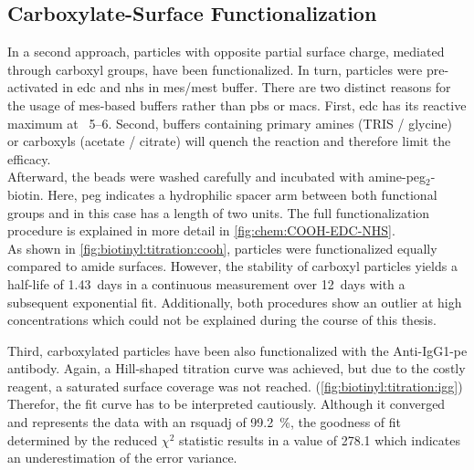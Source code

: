 \subsection{Carboxylate-Surface Functionalization}
In a second approach, particles with opposite partial surface charge, mediated through \gls{carboxyl} groups, have been functionalized. In turn, particles were pre-activated in \gls{edc} and \gls{nhs} in \gls{mes}/\gls{mest} buffer. There are two distinct reasons for the usage of \gls{mes}-based buffers rather than \gls{pbs} or \gls{macs}. First, \gls{edc} has its reactive maximum at \pH\ \numrange{5}{6}. Second, buffers containing primary \glspl{amine} (TRIS / glycine) or \glspl{carboxyl} (acetate / citrate) will quench the reaction and therefore limit the efficacy.\\
Afterward, the beads were washed carefully and incubated with \gls{amine}-\acrshort{peg}$_2$-biotin. Here, \gls{peg} indicates a hydrophilic spacer arm between both functional groups and in this case has a length of two units. The full functionalization procedure is explained in more detail in \cref{fig:chem:COOH-EDC-NHS}. \\
As shown in \cref{fig:biotinyl:titration:cooh}, particles were functionalized equally compared to \gls{amide} surfaces. However, the stability of \gls{carboxyl} particles yields a half-life of \SI{1.43}{days} in a continuous measurement over \SI{12}{days} with a subsequent exponential fit. Additionally, both procedures show an outlier at high concentrations which could not be explained during the course of this thesis. 

Third, \gls{carboxyl}ated particles have been also functionalized with the Anti-IgG1-\gls{pe} antibody. Again, a Hill-shaped titration curve was achieved, but due to the costly reagent, a saturated surface coverage was not reached. (\cref{fig:biotinyl:titration:igg}) \\
Therefor, the fit curve has to be interpreted cautiously. Although it converged and represents the data with an \gls{rsquadj} of \SI{99.2}{\percent}, the goodness of fit determined by the reduced $\chi^2$ statistic results in a value of \num{278.1} which indicates an underestimation of the error variance.

\clearpage
